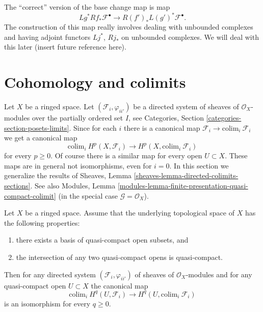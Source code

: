 \begin{remark}
\label{remark-correct-version-base-change-map}
The ``correct'' version of the base change map is map
$$
Lg^* Rf_* \mathcal{F}^\bullet
\longrightarrow
R(f')_* L(g')^*\mathcal{F}^\bullet.
$$
The construction of this map really involves dealing with
unbounded complexes and having adjoint functors $Lj^*$, $Rj_*$
on unbounded complexes. We will deal with this later
(insert future reference here).
\end{remark}



\section{Cohomology and colimits}
\label{section-limits}

\noindent
Let $X$ be a ringed space. Let $(\mathcal{F}_i, \varphi_{ii'})$
be a directed system of sheaves of $\mathcal{O}_X$-modules
over the partially ordered set $I$, see
Categories, Section \ref{categories-section-posets-limits}.
Since for each $i$ there is a canonical map
$\mathcal{F}_i \to \text{colim}_i\ \mathcal{F}_i$ we get a
canonical map
$$
\text{colim}_i\ H^p(X, \mathcal{F}_i)
\longrightarrow
H^p(X, \text{colim}_i\ \mathcal{F}_i)
$$
for every $p \geq 0$. Of course there is a similar map for
every open $U \subset X$. These maps are in general not isomorphisms,
even for $i = 0$. In this section we generalize the results of
Sheaves, Lemma \ref{sheaves-lemma-directed-colimits-sections}.
See also
Modules, Lemma \ref{modules-lemma-finite-presentation-quasi-compact-colimit}
(in the special case $\mathcal{G} = \mathcal{O}_X$).

\begin{lemma}
\label{lemma-quasi-separated-cohomology-colimit}
Let $X$ be a ringed space. Assume that the underlying topological space
of $X$ has the following properties:
\begin{enumerate}
\item there exists a basis of quasi-compact open subsets, and
\item the intersection of any two quasi-compact opens is quasi-compact.
\end{enumerate}
Then for any directed system $(\mathcal{F}_i, \varphi_{ii'})$
of sheaves of $\mathcal{O}_X$-modules and for any quasi-compact open
$U \subset X$ the canonical map
$$
\text{colim}_i\ H^q(U, \mathcal{F}_i)
\longrightarrow
H^q(U, \text{colim}_i\ \mathcal{F}_i)
$$
is an isomorphism for every $q \geq 0$.
\end{lemma}

